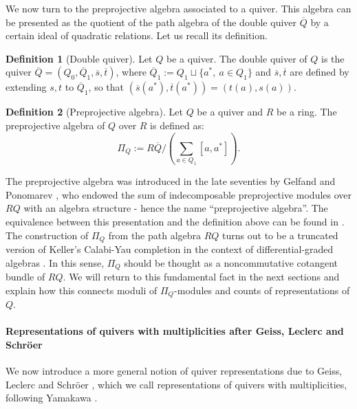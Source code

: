 \documentclass[11pt,english]{article}
\numberwithin{equation}{section}
\numberwithin{figure}{section}
\theoremstyle{definition}
\newtheorem{df}{Definition}[subsection]
\theoremstyle{plain}
\theoremstyle{remark}
\begin{document}
We now turn to the preprojective algebra associated to a quiver. This
algebra can be presented as the quotient of the path algebra of the
double quiver $\overline{Q}$ by a certain ideal of quadratic relations.
Let us recall its definition.

\begin{df}[Double quiver]

Let $Q$ be a quiver. The double quiver of $Q$ is the quiver $\overline{Q}=(Q_{0},\overline{Q}_{1},\overline{s},\overline{t})$,
where $\overline{Q}_{1}:=Q_{1}\sqcup\{a^{*},\ a\in Q_{1}\}$ and $\overline{s},\overline{t}$
are defined by extending $s,t$ to $\overline{Q}_{1}$, so that $(\overline{s}(a^{*}),\overline{t}(a^{*}))=(t(a),s(a))$.

\end{df}

\begin{df}[Preprojective algebra]

Let $Q$ be a quiver and $R$ be a ring. The preprojective algebra
of $Q$ over $R$ is defined as:\[
\Pi_Q:=R\overline{Q}/\left(\sum_{a\in Q_1}[a,a^*]\right).
\]

\end{df}

The preprojective algebra was introduced in the late seventies by
Gelfand and Ponomarev \cite{GP79}, who endowed the sum of indecomposable
preprojective modules over $RQ$ with an algebra structure - hence
the name ``preprojective algebra''. The equivalence between this
presentation and the definition above can be found in \cite{DR79,Rin98,CB99b}.
The construction of $\Pi_{Q}$ from the path algebra $RQ$ turns out
to be a truncated version of Keller's Calabi-Yau completion in the
context of differential-graded algebras \cite{Kel11}. In this sense,
$\Pi_{Q}$ should be thought as a noncommutative cotangent bundle
of $RQ$. We will return to this fundamental fact in the next sections
and explain how this connects moduli of $\Pi_{Q}$-modules and counts
of representations of $Q$.

\paragraph*{Representations of quivers with multiplicities after Geiss, Leclerc
and Schröer}

We now introduce a more general notion of quiver representations due
to Geiss, Leclerc and Schröer \cite{GLS17a}, which we call representations
of quivers with multiplicities, following Yamakawa \cite{Yam10}.
\end{document}

